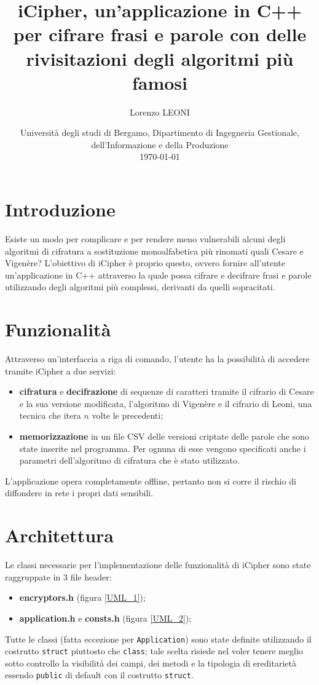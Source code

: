 \documentclass[a4paper, 12pt, one column, aas_macros]{article}
\title{iCipher, un'applicazione in C++ per cifrare frasi e parole con delle rivisitazioni degli algoritmi più famosi}
\author{Lorenzo LEONI}
\date{%
	Università degli studi di Bergamo, Dipartimento di Ingegneria Gestionale, dell'Informazione e della Produzione\\[2ex]%
	\today
}
\begin{document}
	\maketitle
	
	\section{Introduzione}
	Esiste un modo per complicare e per rendere meno vulnerabili alcuni degli algoritmi di cifratura a sostituzione monoalfabetica più rinomati quali Cesare e Vigenère? L'obiettivo di iCipher è proprio questo, ovvero fornire all'utente un'applicazione in C++ attraverso la quale possa cifrare e decifrare frasi e parole utilizzando degli algoritmi più complessi, derivanti da quelli sopracitati.
	
	\section{Funzionalità}
	Attraverso un'interfaccia a riga di comando, l'utente ha la possibilità di accedere tramite iCipher a due servizi:
	\begin{itemize}
		\item \textbf{cifratura} e \textbf{decifrazione} di sequenze di caratteri tramite il cifrario di Cesare e la sua versione modificata, l'algoritmo di Vigenère e il cifrario di Leoni, una tecnica che itera $n$ volte le precedenti;
		\item \textbf{memorizzazione} in un file CSV delle versioni criptate delle parole che sono state inserite nel programma. Per ognuna di esse vengono specificati anche i parametri dell'algoritmo di cifratura che è stato utilizzato.
	\end{itemize}
	L'applicazione opera completamente offline, pertanto non si corre il rischio di diffondere in rete i propri dati sensibili.
	
	\section{Architettura}
	Le classi necessarie per l'implementazione delle funzionalità di iCipher sono state raggruppate in \num{3} file header:
	\begin{itemize}
		\item \textbf{encryptors.h} (figura \ref{UML_1});
		\item \textbf{application.h} e \textbf{consts.h} (figura \ref{UML_2});
	\end{itemize}
	Tutte le classi (fatta eccezione per \verb|Application|) sono state definite utilizzando il costrutto \verb|struct| piuttosto che \verb|class|; tale scelta risiede nel voler tenere meglio sotto controllo la visibilità dei campi, dei metodi e la tipologia di ereditarietà essendo \verb|public| di default con il costrutto \verb|struct|. 
	
\end{document}
